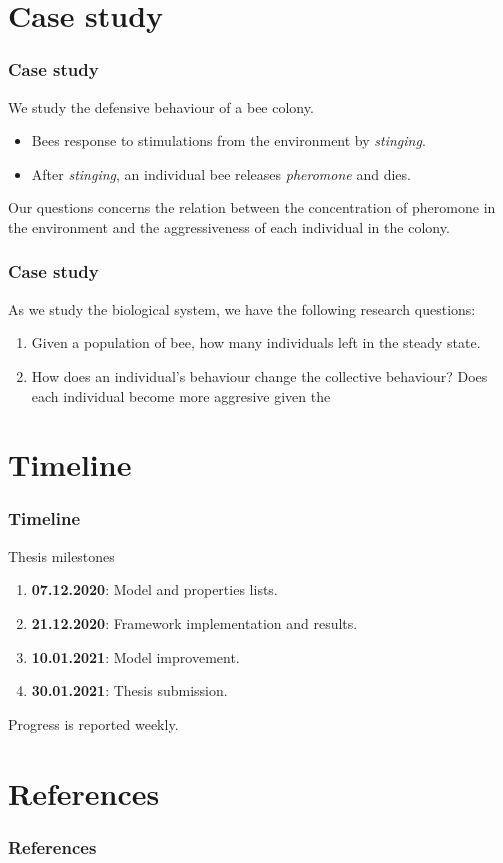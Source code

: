 \documentclass{beamer}
\begin{document}
\section{Case study}
\begin{frame}
  \frametitle{Case study}
  We study the defensive behaviour of a bee colony.
  \begin{itemize}
    \item Bees response to stimulations from the environment by \textit{stinging}.
    \item After \textit{stinging}, an individual bee releases \textit{pheromone}
          and dies.
  \end{itemize}
  Our questions concerns the relation between the concentration of pheromone in
  the environment and the aggressiveness of each individual in the colony.
\end{frame}

\begin{frame}
  \frametitle{Case study}
  As we study the biological system, we have the following research questions:
  \begin{enumerate}
    \item Given a population of bee, how many individuals left in the steady
          state.
    \item How does an individual's behaviour change the collective behaviour? Does
          each individual become more aggresive given the
  \end{enumerate}
\end{frame}

\section{Timeline}
\begin{frame}
  \frametitle{Timeline}
  Thesis milestones
  \begin{enumerate}
    \item \textbf{07.12.2020}: Model and properties lists.
    \item \textbf{21.12.2020}: Framework implementation and results.
    \item \textbf{10.01.2021}: Model improvement.
    \item \textbf{30.01.2021}: Thesis submission.
  \end{enumerate}
  Progress is reported weekly.
\end{frame}

\section{References}
\begin{frame}
  \frametitle{References}
  \printbibliography
\end{frame}
\end{document}
